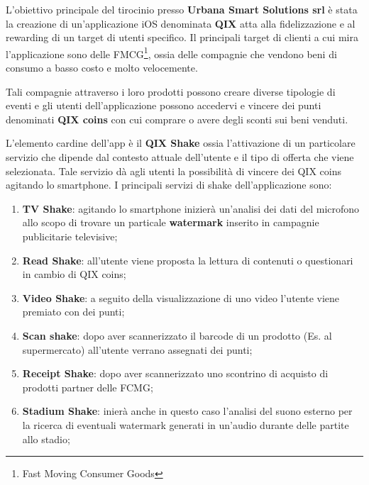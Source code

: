 \normalsize
L’obiettivo principale del tirocinio presso \textbf{Urbana Smart Solutions srl}\cite{urbanasmartsolutions}
è stata la creazione di un'applicazione
iOS denominata \textbf{QIX} atta alla fidelizzazione e al rewarding di un target di utenti specifico. 
Il principali target di clienti a cui mira l'applicazione sono delle FMCG\footnote{Fast Moving Consumer
Goods}, ossia delle compagnie che vendono beni di consumo a basso
costo e molto velocemente.

Tali compagnie attraverso i loro prodotti possono creare diverse
tipologie di eventi e gli utenti dell’applicazione possono accedervi
e vincere dei punti denominati \textbf{QIX coins} con cui comprare o avere degli
sconti sui beni venduti.


L’elemento cardine dell’app è il \textbf{QIX Shake} ossia l’attivazione di un particolare servizio
che dipende dal contesto attuale dell'utente e il tipo di offerta che viene selezionata.
Tale servizio dà agli utenti la possibilità di vincere dei QIX coins agitando lo smartphone.
I principali servizi di shake dell'applicazione sono:

\begin{enumerate}
    \item\textbf{TV Shake}: agitando lo smartphone inizierà un'analisi dei dati del microfono
    allo scopo di trovare un particale \textbf{watermark} inserito in campagnie publicitarie televisive;
    \item\textbf{Read Shake}: all'utente viene proposta la lettura di contenuti o questionari in cambio di QIX coins;
    \item\textbf{Video Shake}: a seguito della visualizzazione di uno video l'utente viene premiato con dei punti;
    \item\textbf{Scan shake}: dopo aver scannerizzato il barcode di un prodotto (Es. al supermercato) all'utente verrano assegnati dei punti;
    \item\textbf{Receipt Shake}: dopo aver scannerizzato uno scontrino di acquisto di prodotti partner delle FCMG;
    \item\textbf{Stadium Shake}: inierà anche in questo caso l'analisi del suono esterno per la ricerca di eventuali watermark
    generati in un'audio durante delle partite allo stadio;
\end{enumerate}


